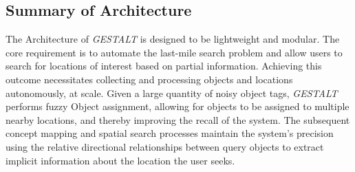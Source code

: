 \subsection{Summary of Architecture}
The Architecture of \textit{GESTALT} is designed to be lightweight and modular. The core requirement is to automate the last-mile search problem and allow users to search for locations of interest based on partial information. 
Achieving this outcome necessitates collecting and processing objects and locations autonomously, at scale.
Given a large quantity of noisy object tags, \emph{GESTALT} performs fuzzy Object assignment, allowing for objects to be assigned to multiple nearby locations, and thereby improving the recall of the system.
The subsequent concept mapping and spatial search processes maintain the system's precision using the relative directional relationships between query objects to extract implicit information about the location the user seeks. 